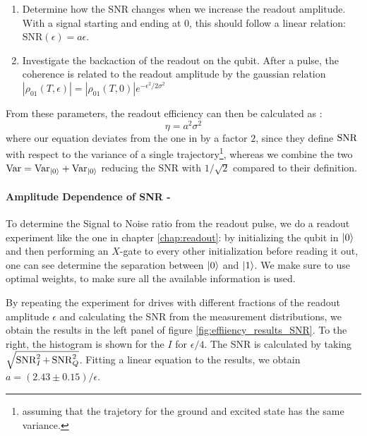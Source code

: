 \begin{enumerate}
    \item Determine how the SNR changes when we increase the readout amplitude. With a signal starting and ending at 0, this should follow a linear relation: $\text{SNR}(\epsilon) = a \epsilon$.
    \item Investigate the backaction of the readout on the qubit. After a pulse, the coherence is related to the readout amplitude by the gaussian relation $|\rho_{01}(T, \epsilon)| = |\rho_{01}(T, 0)|e^{-\epsilon^2/2\sigma^2}$
\end{enumerate}
From these parameters, the readout efficiency can then be calculated as \cite{bultink_general_2018}:
\begin{equation}
    \eta = a^2\sigma^2
\end{equation}
where our equation deviates from the one in \cite{bultink_general_2018} by a factor $2$, since they define $\operatorname{SNR}$ with respect to the variance of a single trajectory\footnote{assuming that the trajetory for the ground and excited state has the same variance.}, whereas we combine the two $\text{Var} = \text{Var}_{\ket{0}} + \text{Var}_{\ket{0}}$ reducing the SNR with $1/\sqrt{2}$ compared to their definition.

\paragraph{Amplitude Dependence of SNR - }
To determine the Signal to Noise ratio from the readout pulse, we do a readout experiment like the one in chapter \ref{chap:readout}: by initializing the qubit in $\ket{0}$ and then performing an $X$-gate to every other initialization before reading it out, one can see determine the separation between $\ket{0}$ and $\ket{1}$. We make sure to use optimal weights, to make sure all the available information is used.


By repeating the experiment for drives with different fractions of the readout amplitude $\epsilon$ and calculating the SNR from the measurement distributions, we obtain the results in the left panel of figure \ref{fig:effiiency_results_SNR}. To the right, the histogram is shown for the $I$ for $\epsilon / 4$. The SNR is calculated by taking $\sqrt{\operatorname{SNR}_I^2 + \operatorname{SNR}_Q^2}$. Fitting a linear equation to the results, we obtain $a = (2.43 \pm 0.15) / \epsilon$. 

